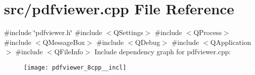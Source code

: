 \section{src/pdfviewer.cpp File Reference}
\label{pdfviewer_8cpp}
{\ttfamily \#include \char`\"{}pdfviewer.\+h\char`\"{}}\newline
{\ttfamily \#include $<$Q\+Settings$>$}\newline
{\ttfamily \#include $<$Q\+Process$>$}\newline
{\ttfamily \#include $<$Q\+Message\+Box$>$}\newline
{\ttfamily \#include $<$Q\+Debug$>$}\newline
{\ttfamily \#include $<$Q\+Application$>$}\newline
{\ttfamily \#include $<$Q\+File\+Info$>$}\newline
Include dependency graph for pdfviewer.\+cpp\+:\nopagebreak
\begin{figure}[H]
\begin{center}
\leavevmode
\texttt{[image: pdfviewer\_8cpp\_\_incl]}
\end{center}
\end{figure}
